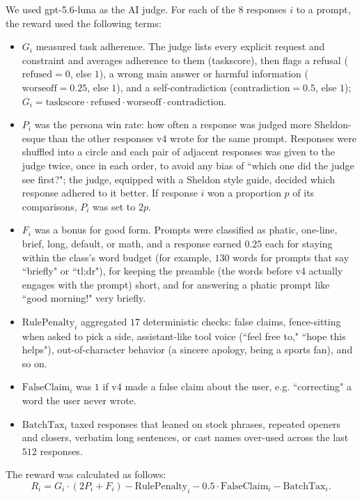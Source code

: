 \documentclass[9pt]{extarticle}
\begin{document}
We used gpt-5.6-luna as the AI judge. For each of the $8$ responses $i$ to a prompt, the reward used the following terms:
\begin{itemize}
    \item $G_i$ measured task adherence. The judge lists every explicit request and constraint and averages adherence to them (taskscore), then flags a refusal ($\text{refused}=0$, else $1$), a wrong main answer or harmful information ($\text{worseoff}=0.25$, else $1$), and a self-contradiction ($\text{contradiction}=0.5$, else $1$); $G_i = \text{taskscore} \cdot \text{refused} \cdot \text{worseoff} \cdot \text{contradiction}$.
    \item $P_i$ was the persona win rate: how often a response was judged more Sheldon-esque than the other responses v4 wrote for the same prompt. Responses were shuffled into a circle and each pair of adjacent responses was given to the judge twice, once in each order, to avoid any bias of ``which one did the judge see first?"; the judge, equipped with a Sheldon style guide, decided which response adhered to it better. If response $i$ won a proportion $p$ of its comparisons, $P_i$ was set to $2p$.
    \item $F_i$ was a bonus for good form. Prompts were classified as phatic, one-line, brief, long, default, or math, and a response earned $0.25$ each for staying within the class's word budget (for example, $130$ words for prompts that say ``briefly" or ``tl;dr"), for keeping the preamble (the words before v4 actually engages with the prompt) short, and for answering a phatic prompt like ``good morning!" very briefly.
    \item $\text{RulePenalty}_i$ aggregated $17$ deterministic checks: false claims, fence-sitting when asked to pick a side, assistant-like tool voice (``feel free to," ``hope this helps"), out-of-character behavior (a sincere apology, being a sports fan), and so on.
    \item $\text{FalseClaim}_i$ was $1$ if v4 made a false claim about the user, e.g. ``correcting" a word the user never wrote.
    \item $\text{BatchTax}_i$ taxed responses that leaned on stock phrases, repeated openers and closers, verbatim long sentences, or cast names over-used across the last $512$ responses.
\end{itemize}

The reward was calculated as follows:
$$R_i = G_i \cdot (2P_i + F_i) - \text{RulePenalty}_i - 0.5\cdot \text{FalseClaim}_i - \text{BatchTax}_i.$$
\end{document}
